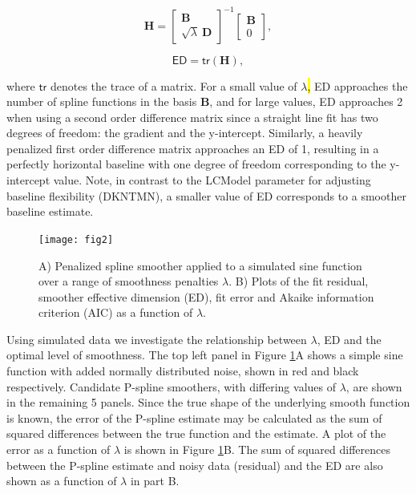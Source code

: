 \documentclass[num-refs]{wiley-article}
\newcommand{\revtwo}[2]{\hl{#1}\marginnote{\hl{#2}}}
\begin{document}
\begin{equation}
  \mathbf{H} =
  \begin{bmatrix}
    \mathbf{B} \\ \sqrt{\lambda}\ \mathbf{D}
  \end{bmatrix}^{-1}
  \begin{bmatrix}
    \mathbf{B} \\ 0
  \end{bmatrix},
\end{equation}

\begin{equation}
  \textsf{ED} = \textsf{tr}(\mathbf{H}),
\end{equation}

where $\textsf{tr}$ denotes the trace of a matrix. For a small value of $\lambda$\revtwo{,}{R1.1} ED approaches the number of spline functions in the basis $\mathbf{B}$, and for large values, ED approaches 2 when using a second order difference matrix since a straight line fit has two degrees of freedom: the gradient and the y-intercept. Similarly, a heavily penalized first order difference matrix approaches an ED of 1, resulting in a perfectly horizontal baseline with one degree of freedom corresponding to the y-intercept value. Note, in contrast to the LCModel parameter for adjusting baseline flexibility (DKNTMN), a smaller value of ED corresponds to a smoother baseline estimate.

\begin{figure}
  \begin{center}
    \texttt{[image: fig2]}
    \caption{A) Penalized spline smoother applied to a simulated sine function over a range of smoothness penalties $\lambda$. B) Plots of the fit residual, smoother effective dimension (ED), fit error and Akaike information criterion (AIC) as a function of $\lambda$.}
    \label{pspline_error}
  \end{center}
\end{figure}

Using simulated data we investigate the relationship between $\lambda$, ED and the optimal level of smoothness. The top left panel in Figure \ref{pspline_error}A shows a simple sine function with added normally distributed noise, shown in red and black respectively. Candidate P-spline smoothers, with differing values of $\lambda$, are shown in the remaining 5 panels. Since the true shape of the underlying smooth function is known, the error of the P-spline estimate may be calculated as the sum of squared differences between the true function and the estimate. A plot of the error as a function of $\lambda$ is shown in Figure \ref{pspline_error}B. The sum of squared differences between the P-spline estimate and noisy data (residual) and the ED are also shown as a function of $\lambda$ in part B.
\end{document}

